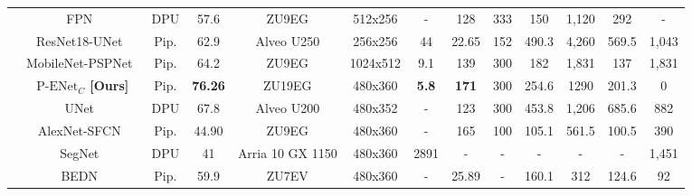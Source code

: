 \documentclass[11pt]{report}
\begin{document}
\begin{table}[h]
{\begin{tabular}{c|c|c|c|c|c|c|c|c|c|c|c|c}
                                                                             & FPN~\cite{fpn-realtime}                    & DPU             & 57.6           & ZU9EG            & 512x256  & -              & 128          & 333 & 150   & 1,120 & 292   & -     \\ \cline{2-13}
                                                                             & ResNet18-UNet~\cite{leblevec:hal-04262138} & Pip.            & 62.9           & Alveo U250       & 256x256  & 44             & 22.65        & 152 & 490.3 & 4,260 & 569.5 & 1,043 \\\cline{2-13}
                                                                             & MobileNet-PSPNet~\cite{mobilenet-pspnet}   & Pip.            & 64.2           & ZU9EG            & 1024x512 & 9.1            & 139          & 300 & 182   & 1,831 & 137   & 1,831 \\ \hline \hline
      \parbox[t]{2mm}{}     & \textbf{$\text{P-ENet}_{C}$ [Ours]}        & Pip.            & \textbf{76.26} & ZU19EG           & 480x360  & \textbf{ 5.8 } & \textbf{171} & 300 & 254.6 & 1290  & 201.3 & 0     \\ 
                                                                             & UNet~\cite{Miyama_2021}                    & DPU             & 67.8           & Alveo U200       & 480x352  & -              & 123          & 300 & 453.8 & 1,206 & 685.6 & 882   \\ 
                                                                             & AlexNet-SFCN~\cite{filter-wise}            & Pip.            & 44.90          & ZU9EG            & 480x360  & -              & 165          & 100 & 105.1 & 561.5 & 100.5 & 390   \\ 
                                                                             & SegNet~\cite{mengqi}                       & DPU             & 41             & Arria 10 GX 1150 & 480x360  & 2891           & -            & -   & -     & -     & -     & 1,451 \\ 
                                                                             & BEDN~\cite{BEDN}                           & Pip.            & 59.9           & ZU7EV            & 480x360  & -              & 25.89        & -   & 160.1 & 312   & 124.6 & 92    \\ \hline
    \end{tabular}}
  \label{tab:comp}
\end{table}
\end{document}

